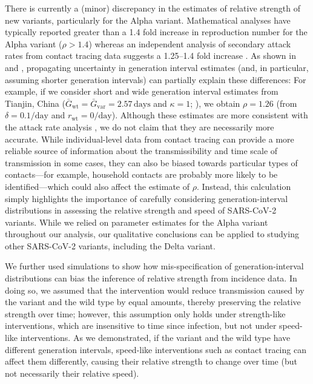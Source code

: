 \documentclass[12pt]{article}
\newcommand{\vvvar}{\mathrm{var}}
\newcommand{\wwwt}{\mathrm{wt}}
\newcommand{\rx}[1]{\ensuremath{{r}_{#1}}\xspace}
\newcommand{\rw}{\rx{\wwwt}}
\newcommand{\days}{\ensuremath{\, \textrm{days}}}
\newcommand{\pday}{\ensuremath{/\textrm{day}}}
\newcommand{\Gx}[1]{\ensuremath{{\bar G}_{#1}}\xspace}
\newcommand{\Gw}{\Gx{\wwwt}}
\newcommand{\Gv}{\Gx{\vvvar}}
\begin{document}
There is currently a (minor) discrepancy in the estimates of relative strength of new variants, particularly for the Alpha variant.
Mathematical analyses have typically reported greater than a 1.4 fold increase in reproduction number for the Alpha variant ($\rho > 1.4$) whereas an independent analysis of secondary attack rates from contact tracing data suggests a 1.25--1.4 fold increase \citep{ukinvest}.
As shown in \cite{davies2021estimated} and \cite{volz2021transmission}, propagating uncertainty in generation interval estimates (and, in particular, assuming shorter generation intervals) can partially explain these differences:
For example, if we consider short and wide generation interval estimates from Tianjin, China ($\Gw=\Gv=2.57\days$ and $\kappa=1$; \cite{ganyani2020estimating}), we obtain $\rho=1.26$ (from $\delta=0.1\pday$ and $\rw = 0\pday$).
Although these estimates are more consistent with the attack rate analysis \citep{ukinvest},
we do not claim that they are necessarily more accurate.
While individual-level data from contact tracing can provide a more reliable source of information about the transmissibility and time scale of transmission in some cases, they can also be biased towards particular types of contacts---for example, household contacts are probably more likely to be identified---which could also affect the estimate of $\rho$.
Instead, this calculation simply highlights the importance of carefully considering generation-interval distributions in assessing the relative strength and speed of SARS-CoV-2 variants.
While we relied on parameter estimates for the Alpha variant throughout our analysis, our qualitative conclusions can be applied to studying other SARS-CoV-2 variants, including the Delta variant.

We further used simulations to show how mis-specification of generation-interval distributions can bias the inference of relative strength from incidence data.
In doing so, we assumed that the intervention would reduce transmission caused by the variant and the wild type by equal amounts, thereby preserving the relative strength over time;
however, this assumption only holds under strength-like interventions, which are insensitive to time since infection, but not under speed-like interventions. 
As we demonstrated, if the variant and the wild type have different generation intervals, speed-like interventions such as contact tracing can affect them differently, causing their relative strength to change over time (but not necessarily their relative speed).
\end{document}
